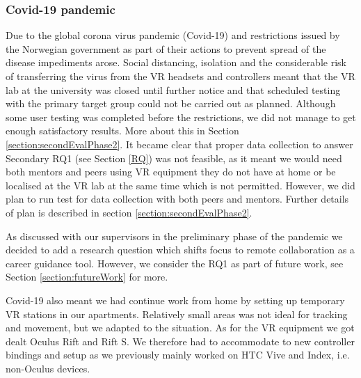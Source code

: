 \subsubsection{Covid-19 pandemic}
\label{section:covid19}
Due to the global corona virus pandemic (Covid-19) and restrictions issued by the Norwegian government as part of their actions to prevent spread of the disease \cite{FhiCorona} impediments arose. Social distancing, isolation and the considerable risk of transferring the virus from the VR headsets and controllers meant that the VR lab at the university was closed until further notice and that scheduled testing with the primary target group could not be carried out as planned. Although some user testing was completed before the restrictions, we did not manage to get enough satisfactory results. More about this in Section \ref{section:secondEvalPhase2}. It became clear that proper data collection to answer Secondary RQ1 (see Section \ref{RQ}) was not feasible, as it meant we would need both mentors and peers using VR equipment they do not have at home or be localised at the VR lab at the same time which is not permitted. However, we did plan to run test for data collection with both peers and mentors. Further details of plan is described in section \ref{section:secondEvalPhase2}.

As discussed with our supervisors in the preliminary phase of the pandemic we decided to add a research question which shifts focus to remote collaboration as a career guidance tool. However, we consider the RQ1 as part of future work, see Section \ref{section:futureWork} for more. 

Covid-19 also meant we had continue work from home by setting up temporary VR stations in our apartments. Relatively small areas was not ideal for tracking and movement, but we adapted to the situation. As for the VR equipment we got dealt Oculus Rift and Rift S. We therefore had to accommodate to new controller bindings and setup as we previously mainly worked on HTC Vive and Index, i.e. non-Oculus devices.            





